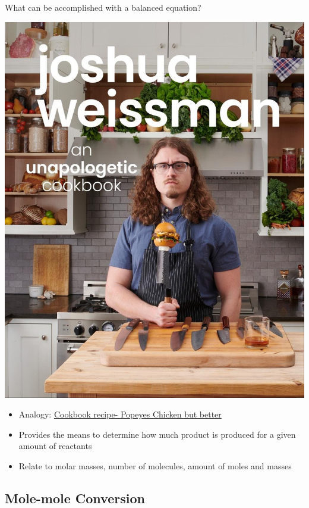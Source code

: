\documentclass[11pt]{beamer}
\begin{document}
\begin{frame}{What can be accomplished with a balanced equation?}
  \begin{center}
    \includegraphics[scale=0.11]{josh_weiss}
  \end{center}
  
  \begin{itemize}
  \item Analogy: \href{https://www.youtube.com/watch?v=T5SYu8tyKjM}{Cookbook recipe-
    Popeyes Chicken but better}
  \item Provides the means to determine how much product is
    produced for a given amount of reactants
  \item Relate to molar masses, number of molecules, amount
    of moles and masses
  \end{itemize}  
\end{frame}

\subsection{Mole-mole Conversion}
\end{document}
